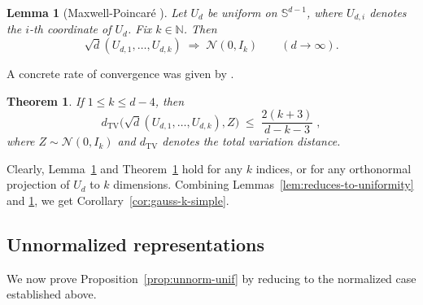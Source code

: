 \documentclass{article}
\newtheorem{theorem}{Theorem}
\newtheorem{lemma}{Lemma}
\newcommand{\Sph}{\mathbb{S}}
\begin{document}
% 
\begin{lemma}[Maxwell-Poincaré \citep{diaconis1984asymptotics}]
\label{lem:maxwell}
Let $U_d$ be uniform on $\Sph^{d-1}$, where $U_{d,i}$ denotes the $i$-th coordinate of $U_d$. Fix $k\in\mathbb N$. Then
\begin{equation}
\label{eq:maxwell}
\sqrt{d}(U_{d,1},\ldots,U_{d,k}) \;\Rightarrow\; \mathcal N(0,I_k) \qquad (d\to\infty).
\end{equation}

\end{lemma}
A concrete rate of convergence was given by \citet{diaconis1987dozen}.
\begin{theorem}\citep{diaconis1987dozen}
If $1\leq k \leq d-4$, then 
\begin{equation}
\label{eq:tv-rate}
d_{\mathrm{TV}}\!\big(\sqrt{d}(U_{d,1},\ldots,U_{d,k}),Z\big)
\;\leq\;\frac{2(k+3)}{d-k-3}\;,
\end{equation}
where $Z \sim \mathcal{N}(0,I_k)$ and $d_{\mathrm{TV}}$ denotes the total variation distance.
\label{thm:conv_rate}
\end{theorem}
Clearly, Lemma~\ref{lem:maxwell} and Theorem~\ref{thm:conv_rate} hold for any $k$ indices, or for any orthonormal projection of $U_d$ to $k$ dimensions.
Combining Lemmas~\ref{lem:reduces-to-uniformity} and \ref{lem:maxwell}, we get Corollary~\ref{cor:gauss-k-simple}.


\subsection{Unnormalized representations}
\label{app:plateau_proof_unnorm}
We now prove Proposition~\ref{prop:unnorm-unif} by reducing to the normalized case established above.
\end{document}
